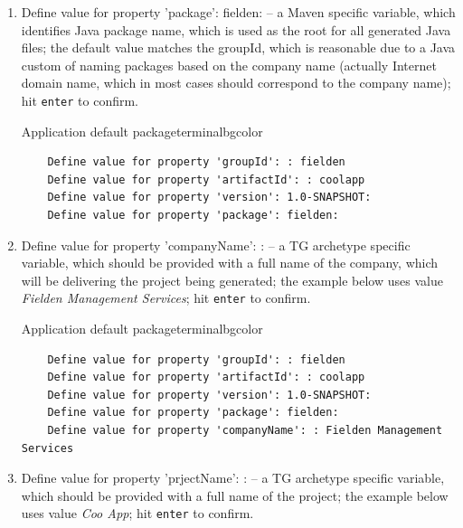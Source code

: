 \begin{enumerate}
    \begin{code}{Application version}{\label{lst::archetype-version}}{terminalbgcolor}
      \begin{lstlisting}
	Define value for property 'groupId': : fielden		
	Define value for property 'artifactId': : coolapp
	Define value for property 'version': 1.0-SNAPSHOT:
      \end{lstlisting}
    \end{code}

    \item Define value for property 'package': fielden: -- a Maven specific variable, which identifies Java package name, which is used as the root for all generated Java files; the default value matches the groupId, which is reasonable due to a Java custom of naming packages based on the company name (actually Internet domain name, which in most cases should correspond to the company name); hit \texttt{enter} to confirm.
    
    \begin{code}{Application default package}{\label{lst::archetype-package}}{terminalbgcolor}
      \begin{lstlisting}
	Define value for property 'groupId': : fielden		
	Define value for property 'artifactId': : coolapp
	Define value for property 'version': 1.0-SNAPSHOT:
	Define value for property 'package': fielden:
      \end{lstlisting}
    \end{code}

    \item Define value for property 'companyName': : -- a TG archetype specific variable, which should be provided with a full name of the company, which will be delivering the project being generated; the example below uses value \emph{Fielden Management Services}; hit \texttt{enter} to confirm.
    
    \begin{code}{Application default package}{\label{lst::archetype-package}}{terminalbgcolor}
      \begin{lstlisting}
	Define value for property 'groupId': : fielden		
	Define value for property 'artifactId': : coolapp
	Define value for property 'version': 1.0-SNAPSHOT:
	Define value for property 'package': fielden:
	Define value for property 'companyName': : Fielden Management Services
      \end{lstlisting}
    \end{code}

    \item Define value for property 'prjectName': : -- a TG archetype specific variable, which should be provided with a full name of the project; the example below uses value \emph{Coo App}; hit \texttt{enter} to confirm.
    

\end{enumerate}
